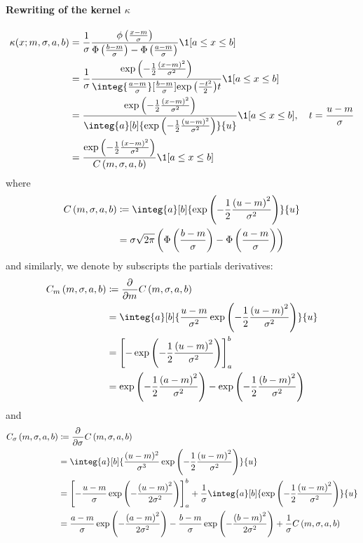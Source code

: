 \paragraph{Rewriting of the kernel $\kappa$}
\begin{align*}
    \kappa(x ; m, \sigma, a, b) &= \frac{1}{\sigma} \frac{\phi\pars{\frac{x-m}{\sigma}}}{\Phi\pars{\frac{b-m}{\sigma}} - \Phi\pars{\frac{a-m}{\sigma}}} \1[a\leq x\leq b] \\
    &= \frac{1}{\sigma} \frac{\e{-\frac{1}{2} \frac{\pars{x-m}^2}{\sigma^2}}}{\integ{\frac{a-m}{\sigma}}[\frac{b-m}{\sigma}]{\e{\frac{-t^2}{2}}}{t}} \1[a\leq x\leq b] \\
    &= \frac{\e{-\frac{1}{2}\frac{\pars{x-m}^2}{\sigma^2}}}{\integ{a}[b]{\e{-\frac{1}{2}\frac{\pars{u-m}^2}{\sigma^2}}}{u}} \1[a\leq x\leq b], \quad t = \frac{u-m}{\sigma} \\
    &= \frac{\e{-\frac{1}{2}\frac{\pars{x-m}^2}{\sigma^2}}}{C\pars{m,\sigma,a,b}} \1[a\leq x\leq b]
\end{align*}
where 
\begin{align*}
    C\pars{m,\sigma,a,b} &\coloneqq \integ{a}[b]{\e{-\frac{1}{2}\frac{\pars{u-m}^2}{\sigma^2}}}{u} \\
    &= \sigma\sqrt{2\pi}\pars{\Phi\pars{\frac{b-m}{\sigma}} - \Phi\pars{\frac{a-m}{\sigma}}}
\end{align*}
and similarly, we denote by subscripts the partials derivatives:
\begin{align*}
    C_m\pars{m,\sigma,a,b} &\coloneqq \partiald{}{m} C\pars{m,\sigma,a,b} \\
    &= \integ{a}[b]{\frac{u-m}{\sigma^2}\e{-\frac{1}{2}\frac{\pars{u-m}^2}{\sigma^2}}}{u} \\
    &= \bracks{-\e{-\frac{1}{2}\frac{\pars{u-m}^2}{\sigma^2}}}_{a}^b \\
    &= \e{-\frac{1}{2}\frac{\pars{a-m}^2}{\sigma^2}} - \e{-\frac{1}{2}\frac{\pars{b-m}^2}{\sigma^2}}
\end{align*}
and 
\begin{align*}
    C_\sigma\pars{m,\sigma,a,b} &\coloneqq \partiald{}{\sigma} C\pars{m,\sigma,a,b} \\
    &= \integ{a}[b]{\frac{(u-m)^2}{\sigma^3}\e{-\frac{1}{2}\frac{\pars{u-m}^2}{\sigma^2}}}{u} \\
    &= \bracks{-\frac{u-m}{\sigma}\e{-\frac{\pars{u-m}^2}{2\sigma^2}}}_{a}^b + \frac{1}{\sigma} \integ{a}[b]{\e{-\frac{1}{2}\frac{\pars{u-m}^2}{\sigma^2}}}{u} \\
    &= \frac{a-m}{\sigma}\e{-\frac{\pars{a-m}^2}{2\sigma^2}} - \frac{b-m}{\sigma}\e{-\frac{\pars{b-m}^2}{2\sigma^2}} + \frac{1}{\sigma}C\pars{m,\sigma,a,b}
\end{align*}

